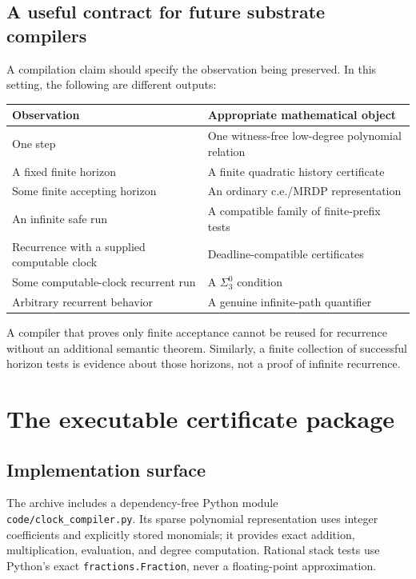\documentclass[11pt,letterpaper]{article}
\theoremstyle{definition}
\theoremstyle{remark}
\newcommand{\code}[1]{\texttt{#1}}
\newcommand{\1}{\mathbf 1}
\begin{document}
\subsection{A useful contract for future substrate compilers}
A compilation claim should specify the observation being preserved. In this
setting, the following are different outputs:
\begin{center}
\begin{tabularx}{\textwidth}{@{}lX@{}}
\toprule
Observation & Appropriate mathematical object\\
\midrule
One step & One witness-free low-degree polynomial relation\\
A fixed finite horizon & A finite quadratic history certificate\\
Some finite accepting horizon & An ordinary c.e./MRDP representation\\
An infinite safe run & A compatible family of finite-prefix tests\\
Recurrence with a supplied computable clock & Deadline-compatible certificates\\
Some computable-clock recurrent run & A $\Sigma^0_3$ condition\\
Arbitrary recurrent behavior & A genuine infinite-path quantifier\\
\bottomrule
\end{tabularx}
\end{center}
A compiler that proves only finite acceptance cannot be reused for recurrence
without an additional semantic theorem. Similarly, a finite collection of
successful horizon tests is evidence about those horizons, not a proof of
infinite recurrence.
\section{The executable certificate package}\label{lbh:sec:implementation}

\subsection{Implementation surface}
The archive includes a dependency-free Python module
\code{code/clock\_compiler.py}. Its sparse polynomial representation uses
integer coefficients and explicitly stored monomials; it provides exact
addition, multiplication, evaluation, and degree computation. Rational
stack tests use Python's exact \code{fractions.Fraction}, never a
floating-point approximation.
\end{document}
